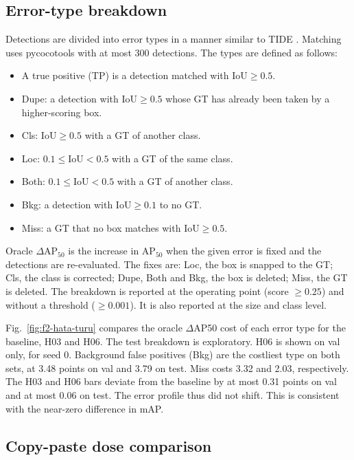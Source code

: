 \subsection{Error-type breakdown}\label{sec:bulgu-hata}
Detections are divided into error types in a manner similar to TIDE \cite{bolya_2020_tide}. Matching uses pycocotools with at most 300 detections. The types are defined as follows:
\begin{itemize}
\item A true positive (TP) is a detection matched with IoU$\ge0.5$.
\item Dupe: a detection with IoU$\ge0.5$ whose GT has already been taken by a higher-scoring box.
\item Cls: IoU$\ge0.5$ with a GT of another class.
\item Loc: $0.1\le$IoU$<0.5$ with a GT of the same class.
\item Both: $0.1\le$IoU$<0.5$ with a GT of another class.
\item Bkg: a detection with IoU$\ge0.1$ to no GT.
\item Miss: a GT that no box matches with IoU$\ge0.5$.
\end{itemize}
Oracle $\Delta$AP$_{50}$ is the increase in AP$_{50}$ when the given error is fixed and the detections are re-evaluated. The fixes are: Loc, the box is snapped to the GT; Cls, the class is corrected; Dupe, Both and Bkg, the box is deleted; Miss, the GT is deleted. The breakdown is reported at the operating point (score $\ge0.25$) and without a threshold ($\ge0.001$). It is also reported at the size and class level.



Fig.~\ref{fig:f2-hata-turu} compares the oracle $\Delta$AP50 cost of each error type for the baseline, H03 and H06. The test breakdown is exploratory. H06 is shown on val only, for seed 0. Background false positives (Bkg) are the costliest type on both sets, at 3.48 points on val and 3.79 on test. Miss costs 3.32 and 2.03, respectively. The H03 and H06 bars deviate from the baseline by at most 0.31 points on val and at most 0.06 on test. The error profile thus did not shift. This is consistent with the near-zero difference in mAP.

\subsection{Copy-paste dose comparison}



